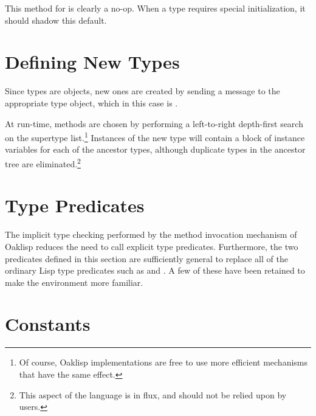 
This method for  is clearly a no-op.  When a type
requires special initialization, it should shadow this default.

\section{Defining New Types}

Since types are objects, new ones are created by sending
a  message to the appropriate type object, which in this
case is .


At run-time, methods are chosen by performing a left-to-right
depth-first search on the supertype list.\footnote{Of course, Oaklisp
implementations are free to use more efficient mechanisms that have
the same effect.} Instances of the new type will contain a block of
instance variables for each of the ancestor types, although duplicate
types in the ancestor tree are eliminated.\footnote{This aspect of the
language is in flux, and should not be relied upon by users.}

\section{Type Predicates}

The implicit type checking performed by the method invocation
mechanism of Oaklisp reduces the need to call explicit type
predicates.  Furthermore, the two predicates defined in this section
are sufficiently general to replace all of the ordinary Lisp type
predicates such as  and .  A few of these have
been retained to make the environment more familiar.



\section{Constants}

